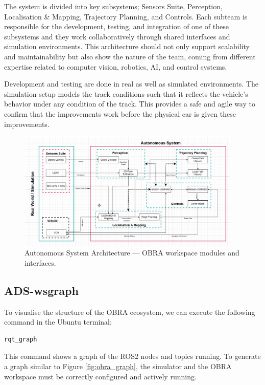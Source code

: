 \documentclass[a4paper,11pt]{report}
\begin{document}
The system is divided into key subsystems; Sensors Suite, Perception, Localisation \& Mapping,
Trajectory Planning, and Controls. Each subteam is responsible for the development, testing, and integration
of one of these subsystems and they work collaboratively through shared interfaces and simulation environments.
This architecture should not only support scalability and maintainability but also show the nature of the team,
coming from different expertise related to computer vision, robotics, AI, and control systems.

Development and testing are done in real as well as simulated environments.
The simulation setup models the track conditions such that it reflects the vehicle’s behavior
under any condition of the track. This provides a safe and agile way to confirm that the
improvements work before the physical car is given these improvements.


\begin{figure}[H]
    \centering
    \includegraphics[width=0.95\textwidth]{Images/SoftwareArchitecture.png}
    \caption{Autonomous System Architecture — OBRA workspace modules and interfaces.}
    \label{fig:software_architecture}
\end{figure}

\subsection{ADS-wsgraph}
To visualise the structure of the OBRA ecosystem, we can execute the following command in the Ubuntu terminal:
\begin{verbatim}
rqt_graph
\end{verbatim}

This command shows a graph of the ROS2 nodes and topics running.
To generate a graph similar to Figure \ref{fig:obra_graph}, the simulator and the OBRA workspace must be correctly configured and actively running.
\end{document}
